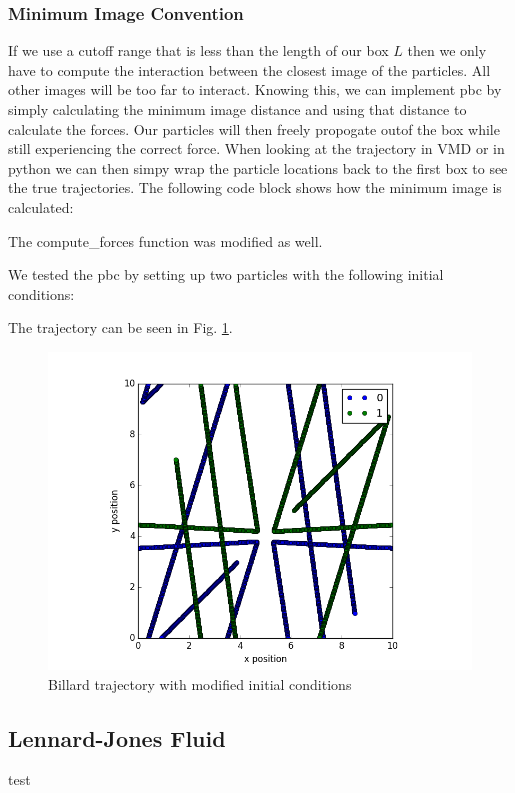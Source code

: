 \documentclass[11pt,a4paper]{scrartcl}
\makeatletter
\newcommand{\listfile}[6]{
}
\makeatother
\begin{document}
\subsubsection{Minimum Image Convention}
If we use a cutoff range that is less than the length of our box $L$ then we only have to compute the interaction between the closest image of the particles. All other images will be too far to interact. Knowing this, we can implement pbc by simply calculating the minimum image distance and using that distance to calculate the forces. Our particles will then freely propogate outof the box while still experiencing the correct force. When looking at the trajectory in VMD or in python we can then simpy wrap the particle locations back to the first box to see the true trajectories. The following code block shows how the minimum image is calculated:
 \listfile{../src/ljbillards1.py}{/src/ljbillards1.py}{54}{57}{Minimum Image}{image}
 The compute\_forces function was modified as well.
  \listfile{../src/ljbillards1.py}{/src/ljbillards1.py}{5}{19}{PBC Forces}{pbcforces}
We tested the pbc by setting up two particles with the following initial conditions:
 \listfile{../src/ljbillards1.py}{/src/ljbillards1.py}{67}{75}{Initial Conditions}{init}
The trajectory can be seen in Fig. \ref{fig:pbc}. 
\begin{figure}[h]
\includegraphics[width=0.7\linewidth]{../fig/pbcplot.png}
  \centering
  \caption{Billard trajectory with modified initial conditions}
\label{fig:pbc}
\end{figure}
\subsection{Lennard-Jones Fluid}
test
\end{document}
